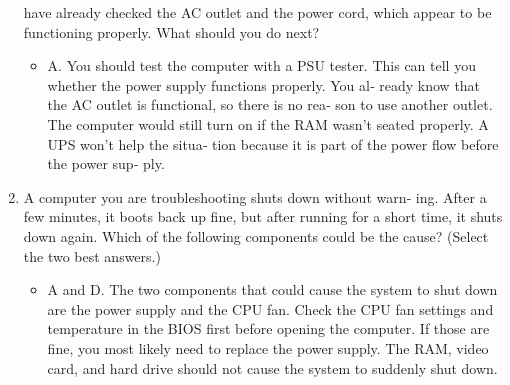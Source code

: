\documentclass{article}
\begin{document}
\begin{enumerate}
have already checked the AC outlet and the power cord, which
appear to be functioning properly. What should you do next?
    \begin{itemize}
        \item A. You should test the computer with a PSU tester. This can
tell you whether the power supply functions properly. You al‐
ready know that the AC outlet is functional, so there is no rea‐
son to use another outlet. The computer would still turn on if
the RAM wasn’t seated properly. A UPS won’t help the situa‐
tion because it is part of the power flow before the power sup‐
ply.
    \end{itemize}
    \item A computer you are troubleshooting shuts down without warn‐
ing. After a few minutes, it boots back up fine, but after running
for a short time, it shuts down again. Which of the following
components could be the cause? (Select the two best answers.)
    \begin{itemize}
        \item A and D. The two components that could cause the system to
shut down are the power supply and the CPU fan. Check the
CPU fan settings and temperature in the BIOS first before
opening the computer. If those are fine, you most likely need
to replace the power supply. The RAM, video card, and hard
drive should not cause the system to suddenly shut down.
    \end{itemize}
    
\end{enumerate}
\end{document}
